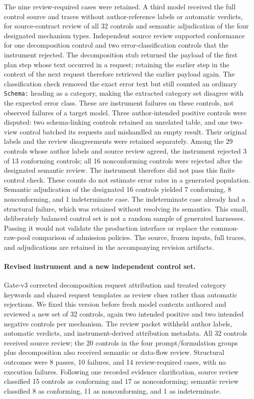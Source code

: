 The nine review-required cases were retained. A third model received the
full control source and traces without author-reference labels or
automatic verdicts, for source-contract review of all 32 controls and
semantic adjudication of the four designated mechanism types.
Independent source review supported conformance for one decomposition
control and two error-classification controls that the instrument rejected.
The decomposition stub returned the payload of the first plan step whose
text occurred in a request; retaining the earlier step in the context of
the next request therefore retrieved the earlier payload again. The
classification check removed the exact error text but still counted
an ordinary \texttt{Schema:} heading as a category, making the extracted
category set disagree with the expected error class. These are instrument
failures on these controls, not observed failures of a target model.
Three author-intended positive controls were disputed: two schema-linking
controls retained an unrelated table, and one two-view control batched
its requests and mishandled an empty result. Their original labels and
the review disagreements were retained separately. Among the 29 controls
whose author labels and source review agreed, the instrument rejected
3 of 13 conforming controls; all 16 nonconforming controls were rejected
after the designated semantic review. The instrument therefore did not
pass this finite control check. These counts do not estimate error rates
in a generated population.
Semantic adjudication of the designated 16 controls yielded 7 conforming,
8 nonconforming, and 1 indeterminate case. The indeterminate case already
had a structural failure, which was retained without resolving its semantics.
This small, deliberately balanced control set is not a random sample of
generated harnesses. Passing it would not validate the production
interface or replace the common-raw-pool comparison of admission policies.
The source, frozen inputs, full traces, and adjudications are retained
in the accompanying revision artifacts.

\paragraph{Revised instrument and a new independent control set.}
Gate-v3 corrected decomposition request attribution and treated category
keywords and shared request templates as review clues rather than automatic
rejections. We fixed this version before fresh model contexts authored and
reviewed a new set of 32 controls, again two intended positive and two intended
negative controls per mechanism. The review packet withheld author labels,
automatic verdicts, and instrument-derived attribution metadata. All 32
controls received source review; the 20 controls in the four prompt/formulation
groups plus decomposition also received semantic or data-flow review.
Structural outcomes were 8 passes, 10 failures, and 14 review-required cases,
with no execution failures. Following one recorded evidence clarification,
source review classified 15 controls as conforming and 17 as nonconforming;
semantic review classified 8 as conforming, 11 as nonconforming, and 1 as
indeterminate.

